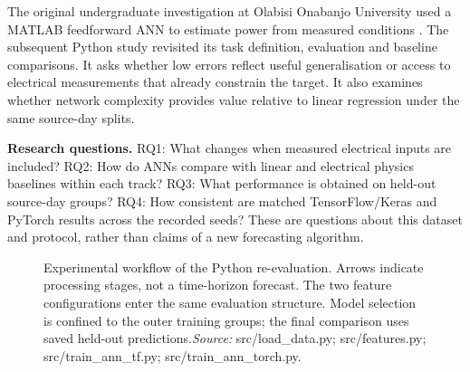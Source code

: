 \documentclass[10pt,journal,twoside]{IEEEtran}
\begin{document}
The original undergraduate investigation at Olabisi Onabanjo University used a MATLAB
feedforward ANN to estimate power from measured conditions \cite{ref1}.
The subsequent Python study revisited its task definition, evaluation and baseline comparisons.
It asks whether low errors reflect useful generalisation or access to electrical measurements
that already constrain the target. It also examines whether network complexity provides value
relative to linear regression under the same source-day splits.

\textbf{Research questions.} RQ1: What changes when measured electrical inputs are included?
RQ2: How do ANNs compare with linear and electrical physics baselines within each track?
RQ3: What performance is obtained on held-out source-day groups?
RQ4: How consistent are matched TensorFlow/Keras and PyTorch results across the recorded seeds?
These are questions about this dataset and protocol, rather than claims of a new forecasting algorithm.


\begin{figure}[!t]\centering


\caption{Experimental workflow of the Python re-evaluation. Arrows indicate processing stages, not a time-horizon forecast. The two feature configurations enter the same evaluation structure. Model selection is confined to the outer training groups; the final comparison uses saved held-out predictions.\newline\textit{Source:} src/\allowbreak{}load\_data.py; src/\allowbreak{}features.py; src/\allowbreak{}train\_ann\_tf.py; src/\allowbreak{}train\_ann\_torch.py.}

\label{fig:1}

\end{figure}
\end{document}
